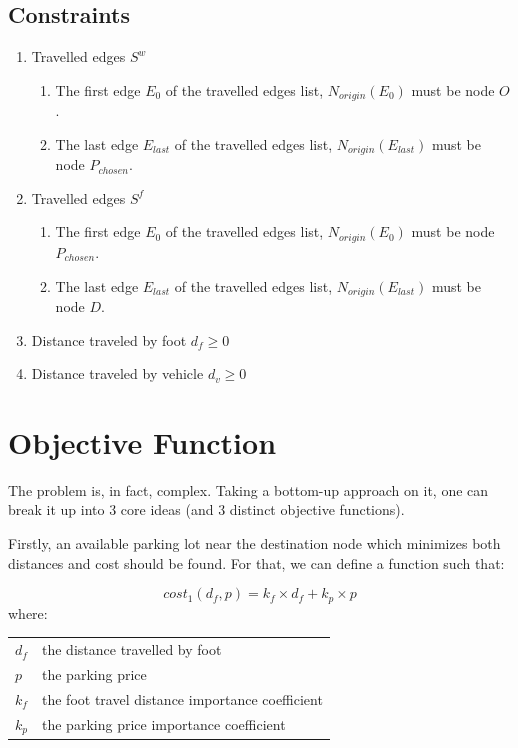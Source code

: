 \documentclass[a4paper, 12pt]{report}
\makeatletter
\newenvironment{conditions}
  {\par\vspace{\abovedisplayskip}\noindent\begin{tabular}{>{$}l<{$} @{${}={}$} l}}
  {\end{tabular}\par\vspace{\belowdisplayskip}}
\makeatother
\begin{document}
    \subsection{Constraints}
    \begin{enumerate}
        \item Travelled edges $S^w$
        \begin{enumerate}
            \item The first edge $E_{0}$ of the travelled edges list, $N_{origin}(E_{0})$ must be node $O$.
            \item The last edge $E_{last}$ of the travelled edges list, $N_{origin}(E_{last})$ must be node $P_{chosen}$.
        \end{enumerate}
        \item Travelled edges $S^f$
        \begin{enumerate}
            \item The first edge $E_{0}$ of the travelled edges list, $N_{origin}(E_{0})$ must be node $P_{chosen}$.
            \item The last edge $E_{last}$ of the travelled edges list, $N_{origin}(E_{last})$ must be node $D$.
        \end{enumerate} 
        \item Distance traveled by foot $d_f \geqslant 0$
        \item Distance traveled by vehicle $d_v \geqslant 0$
    
    \end{enumerate}
    
    \pagebreak
    
    \section{Objective Function} \label{ofunc}

    The problem is, in fact, complex. Taking a bottom-up approach on it, one can break it up into 3 core ideas (and 3 distinct objective functions). 
    
    Firstly, an available parking lot near the destination node which minimizes both distances and cost should be found. For that, we can define a function such that:
    
    \begin{equation}
        cost_1(d_f, p) = k_f \times d_f + k_p \times p
    \end{equation}
    where:
    \begin{conditions}
        d_f     &  the distance travelled by foot \\
        p    &  the parking price \\   
        k_f  &  the foot travel distance importance coefficient  \\
        k_p       &  the parking price importance coefficient  \\
    \end{conditions}
    
\end{document}

